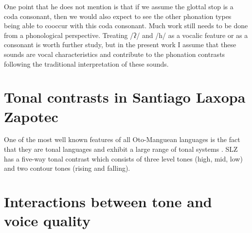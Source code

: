 One point that he does not mention is that if we assume the glottal stop is a coda consonant, then we would also expect to see the other phonation types being able to cooccur with this coda consonant. Much work still needs to be done from a phonological perspective. Treating /ʔ/ and /h/ as a vocalic feature or as a consonant is worth further study, but in the present work I assume that these sounds are vocal characteristics and contribute to the phonation contrasts following the traditional interpretation of these sounds. 

\section{Tonal contrasts in Santiago Laxopa Zapotec} \label{sec:SLZ-tones}
One of the most well known features of all Oto-Manguean languages is the fact that they are tonal languages and exhibit a large range of tonal systems \citep{pikeProblemsZapotecTone1948,renschComparativeOtomangueanPhonology1976,josserandMixtecDialectHistory1983,silvermanLaryngealComplexityOtomanguean1997,beamdeazconaProblemsZapotecTone2007,dicanioItunyosoTrique2010,dicanioCoarticulationToneGlottal2012,elliottChicahuaxtlaTriqui2016,campbellOtomangueanHistoricalLinguistics2017,campbellOtomangueanHistoricalLinguistics2017a,lillehaugenOtomangueanLanguages2019,eischensTonePhonationPhonologyPhonetics2022}. SLZ has a five-way tonal contrast which consists of three level tones (high, mid, low) and two contour tones (rising and falling). 

\citet{brinkerhoffTonalPatternsTheir2022}

\section{Interactions between tone and voice quality} \label{sec:SLZ-interaction}

